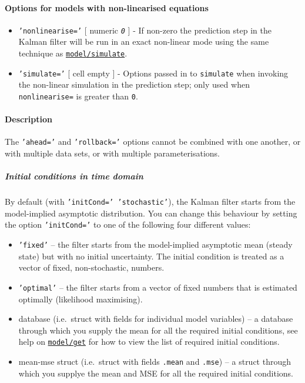 \paragraph{Options for models with non-linearised
equations}\label{options-for-models-with-non-linearised-equations}

\begin{itemize}
\item
  \texttt{'nonlinearise='} {[} numeric \textbar{} \emph{\texttt{0}} {]}
  - If non-zero the prediction step in the Kalman filter will be run in
  an exact non-linear mode using the same technique as
  \href{model/simulate}{\texttt{model/simulate}}.
\item
  \texttt{'simulate='} {[} cell \textbar{} empty {]} - Options passed in
  to \texttt{simulate} when invoking the non-linear simulation in the
  prediction step; only used when \texttt{nonlinearise=} is greater than
  \texttt{0}.
\end{itemize}

\paragraph{Description}\label{description}

The \texttt{'ahead='} and \texttt{'rollback='} options cannot be
combined with one another, or with multiple data sets, or with multiple
parameterisations.

\subparagraph{Initial conditions in time
domain}\label{initial-conditions-in-time-domain}

By default (with \texttt{'initCond=' 'stochastic'}), the Kalman filter
starts from the model-implied asymptotic distribution. You can change
this behaviour by setting the option \texttt{'initCond='} to one of the
following four different values:

\begin{itemize}
\item
  \texttt{'fixed'} -- the filter starts from the model-implied
  asymptotic mean (steady state) but with no initial uncertainty. The
  initial condition is treated as a vector of fixed, non-stochastic,
  numbers.
\item
  \texttt{'optimal'} -- the filter starts from a vector of fixed numbers
  that is estimated optimally (likelihood maximising).
\item
  database (i.e.~struct with fields for individual model variables) -- a
  database through which you supply the mean for all the required
  initial conditions, see help on \href{model/get}{\texttt{model/get}}
  for how to view the list of required initial conditions.
\item
  mean-mse struct (i.e.~struct with fields \texttt{.mean} and
  \texttt{.mse}) -- a struct through which you supplye the mean and MSE
  for all the required initial conditions.
\end{itemize}

